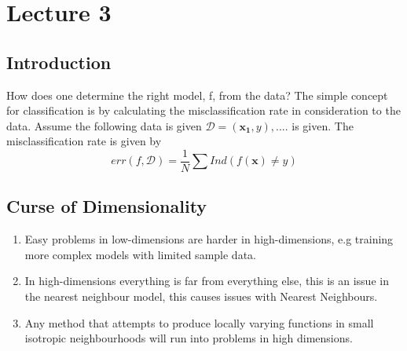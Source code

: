 \documentclass[12pt]{article}
\numberwithin{equation}{section}
\begin{document}
\section{Lecture 3}

\subsection{Introduction}
How does one determine the right model, f, from the data? The simple concept for classification is by calculating the misclassification rate in consideration to the data. Assume the following data is given $\mathcal{D} = {(\bm{x_1},y),....}$ is given. The misclassification rate is given by
\begin{equation}
err(f,\mathcal{D}) = \frac{1}{N}\sum Ind(f(\bm{x}) \neq y)
\end{equation}

\subsection{Curse of Dimensionality}
\begin{enumerate}
    \item Easy problems in low-dimensions are harder in high-dimensions, e.g training more complex models with limited sample data.
    \item In high-dimensions everything is far from everything else, this is an issue in the nearest neighbour model, this causes issues with Nearest Neighbours.
    \item Any method that attempts to produce locally varying functions in small isotropic neighbourhoods will run into problems in high dimensions.
\end{enumerate}
\end{document}

